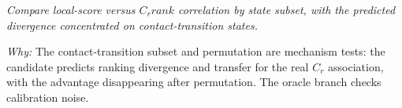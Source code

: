 \documentclass[10pt,a4paper]{article}
\begin{document}
\begin{enumerate}[leftmargin=*,start=5]
\noindent\emph{Compare local-score versus \(C_{r} rank\) correlation by state subset, with the predicted divergence concentrated on contact-transition states.}
\par{}
\par\emph{Why:} The contact-transition subset and permutation are mechanism tests: the candidate predicts ranking divergence and transfer for the real \(C_{r}\) association, with the advantage disappearing after permutation. The oracle branch checks calibration noise.
\end{enumerate}
\end{document}
